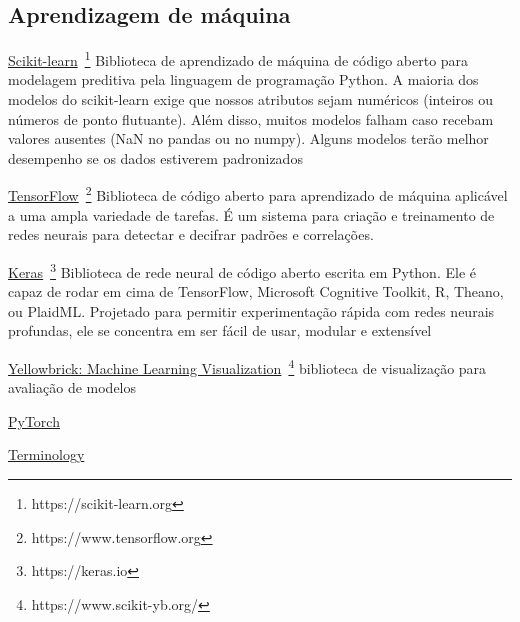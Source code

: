 \subsection{Aprendizagem de máquina}

\underline{Scikit-learn}~\footnote{https://scikit-learn.org}
Biblioteca de aprendizado de máquina de código aberto para modelagem preditiva pela linguagem de programação Python.
A maioria dos modelos do scikit-learn exige que nossos atributos sejam numéricos (inteiros ou números de ponto
flutuante). 
Além disso, muitos modelos falham caso recebam valores ausentes (NaN no pandas ou no numpy). 
Alguns modelos terão melhor desempenho se os dados estiverem padronizados 


\underline{TensorFlow}~\footnote{https://www.tensorflow.org}
Biblioteca de código aberto para aprendizado de máquina aplicável a uma ampla variedade de tarefas. 
É um sistema para criação e treinamento de redes neurais para detectar e decifrar padrões e correlações.


\underline{Keras}~\footnote{https://keras.io}
Biblioteca de rede neural de código aberto escrita em Python. 
Ele é capaz de rodar em cima de TensorFlow, Microsoft Cognitive Toolkit, R, Theano, ou PlaidML. 
Projetado para permitir experimentação rápida com redes neurais profundas, ele se concentra em ser fácil de usar, modular e extensível


\underline{Yellowbrick: Machine Learning Visualization}~\footnote{https://www.scikit-yb.org/}
biblioteca de visualização para avaliação de modelos


\underline{PyTorch}


\underline{Terminology}